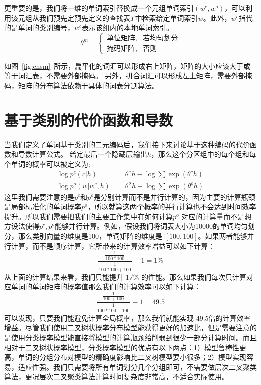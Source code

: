 更重要的是，我们将一维的单词索引替换成一个元组单词索引$(w ^ c,w ^ o)$，可以利用该元组从我们预先定预先定义的查找表$\Gamma $中检索给定单词索引$ w $。此外，$ w ^ c $指代的是单词的类别编号，$ w^c $表示该组内的本地单词索引。
\begin{equation}\label{equ:partition}
 \theta^m=
\begin{cases}
    \text{单位矩阵} ,& \text{若均匀划分} \\
    \text{掩码矩阵},   & \text{否则}
\end{cases}
\end{equation}


如图~\ref{fig:chsm}~所示，扁平化的词汇可以形成右上矩阵，矩阵的大小应该大于或等于词汇表，不需要外部掩码。
另外，拼合词汇可以形成左上矩阵，需要外部掩码，矩阵的分布算法依赖于具体的词表分割算法。

\section{基于类别的代价函数和导数}
当我们定义了单词基于类别的二元编码后，我们接下来讨论基于这种编码的代价函数和导数计算公式。
给定最后一个隐藏层输出$ h $，那么这个分区组中的每个组和每个单词的概率可以被定义为:
\begin{equation}
\begin{split}
\log p^c(c|h) &= \theta^c h-\log \sum{\exp( \theta^c h )} \\
\log p^o(w|w^c,h)&=\theta^o h -\log\sum\exp{(\theta^o h)}
\end{split}
\end{equation}
这里我们需要注意的是$ p ^ c $和$ p ^o $是分别计算而不是并行计算的，因为主要的计算瓶颈是局部标准化的单词概率$ p ^ o $，所以就算这两个概率的并行计算也不会达到时间效率提升。所以我们需要把我们的主要工作集中在如何计算$p^o$ 对应的计算量而不是想方设法使得$p^c,p^o$能够并行计算。例如，假设我们将词表大小为10000的单词均匀划分，那么类别向量的维度是100，单词矩阵的维度是 $[100,100]$。如果两者能够并行计算，而不是顺序计算，它所带来的计算效率增益可以如下计算：
\begin{equation}\label{equ:example}
  \frac{\frac{1}{100*100}}{\frac{1}{100*100+100}}-1=1\%
\end{equation}
从上面的计算结果来看，我们只能提升 $1/\%$ 的性能。那么如果我们每次只计算对应单词的单词矩阵的概率值那么我们的计算效率可以如下计算：
\begin{equation}\label{equ:example2}
  \frac{\frac{1}{100+100}}{\frac{1}{100*100+100}}-1=49.5
\end{equation}
可以发现，只要我们能避免计算全局概率，那么我们就能实现 $49.5$倍的计算效率增益。尽管我们使用二叉树状概率分布模型能获得更好的加速比，但是需要注意的是使用分类概率模型能直接将模型的计算瓶颈给削弱到很少一部分计算时间。而且相对于二叉树状概率模型，分类概率模型的优点有以下两点：1）模型鲁棒性更高，单词的分组分布对模型的精确度影响比二叉树模型要小很多；2）模型实现容易，适应性强。我们只需要将所有单词划分几个分组即可，不需要做层次二叉聚类算法，更况层次二叉聚类算法计算时间复杂度非常高，不适合实际使用。


